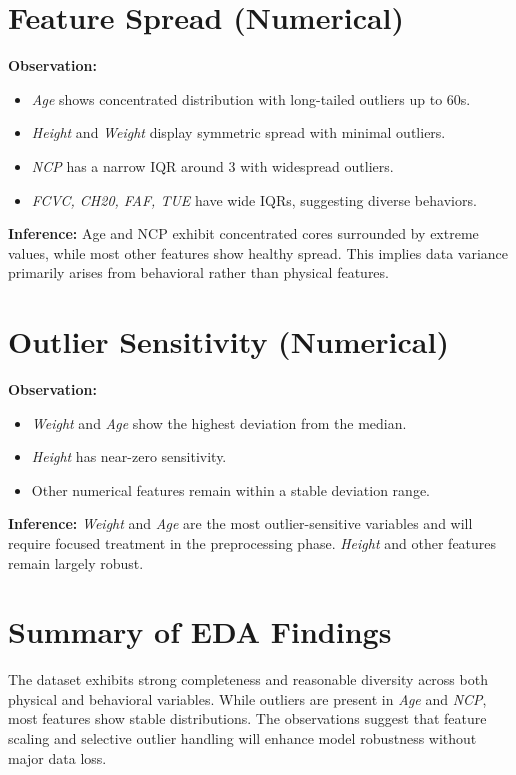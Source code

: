 \section{Feature Spread (Numerical)}\label{sec:feature-spread-(numerical)}

\textbf{Observation:}
\begin{itemize}
    \item \textit{Age} shows concentrated distribution with long-tailed outliers up to 60s.
    \item \textit{Height} and \textit{Weight} display symmetric spread with minimal outliers.
    \item \textit{NCP} has a narrow IQR around 3 with widespread outliers.
    \item \textit{FCVC, CH20, FAF, TUE} have wide IQRs, suggesting diverse behaviors.
\end{itemize}

\textbf{Inference:}
Age and NCP exhibit concentrated cores surrounded by extreme values, while most other features show healthy spread.
This implies data variance primarily arises from behavioral rather than physical features.



\section{Outlier Sensitivity (Numerical)}\label{sec:outlier-sensitivity-(numerical)}

\textbf{Observation:}
\begin{itemize}
    \item \textit{Weight} and \textit{Age} show the highest deviation from the median.
    \item \textit{Height} has near-zero sensitivity.
    \item Other numerical features remain within a stable deviation range.
\end{itemize}

\textbf{Inference:}
\textit{Weight} and \textit{Age} are the most outlier-sensitive variables and will require focused treatment in the preprocessing phase.
\textit{Height} and other features remain largely robust.



\section*{Summary of EDA Findings}
The dataset exhibits strong completeness and reasonable diversity across both physical and behavioral variables.
While outliers are present in \textit{Age} and \textit{NCP}, most features show stable distributions.
The observations suggest that feature scaling and selective outlier handling will enhance model robustness without major data loss.

